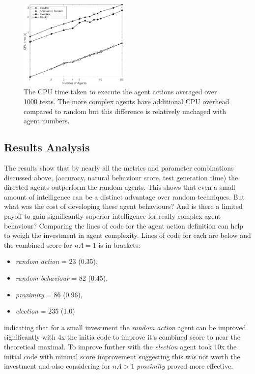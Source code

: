 \documentclass[letterpaper, 10 pt, journal, twoside]{IEEEtran}
\begin{document}
\begin{figure}[!t]
	\centering
\includegraphics[width=0.48\textwidth]{TimeCPU.pdf}
	\caption{The CPU time taken to execute the agent actions averaged over 1000 tests. The more complex agents have additional CPU overhead compared to random but this difference is relatively unchaged with agent numbers.}
	\label{CPUTime}
\end{figure}




\subsection{Results Analysis}
The results show that by nearly all the metrics and parameter combinations discussed above, (accuracy, natural behaviour score, test generation time) the directed agents outperform the random agents. This shows that even a small amount of intelligence can be a distinct advantage over random techniques. 
%
But what was the cost of developing these agent behaviours?
And is there a limited payoff to gain significantly superior intelligence for really complex agent behaviour? %
%
Comparing the lines of code for the agent action definition can help to weigh the investment in agent complexity. Lines of code for each are below and the combined score for $nA=1$ is in brackets:
\begin{itemize}
  \item \textit{random action} = 23 (0.35),
  \item \textit{random behaviour} = 82 (0.45),
  \item \textit{proximity} = 86 (0.96),
  \item \textit{election} = 235 (1.0) 
\end{itemize}
indicating that for a small investment the \textit{random action} agent can be improved significantly with 4x the initia code to improve it's combined score to near the theoretical maximal. To improve further with the \textit{election} agent took 10x the initial code with minmal score improvement suggesting this was not worth the investment and also considering for $nA>1$ \textit{proximity} proved more effective.
\end{document}
